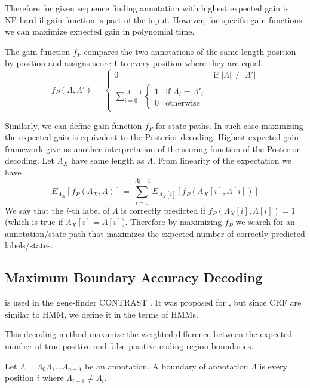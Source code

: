 Therefore for given sequence finding annotation with highest expected gain is
NP-hard if gain function is part of the input. However, for specific gain
functions we can maximize expected gain in polynomial time.

The gain function $f_P$ compares the two annotations of the same length position
by position and assigns score $1$ to every position where they are equal.
\begin{equation}
f_P(\Lambda,\Lambda') = 
\begin{cases}
0 & \text{if $|\Lambda|\not=|\Lambda'|$}\\
\sum_{i=0}^{|\Lambda|-1}\begin{cases}
1 & \text{if $\Lambda_i=\Lambda'_i$}\\
0 & \text{otherwise}
\end{cases}
\end{cases}
\end{equation}

Similarly, we can define gain function $f_P$ for state paths. In such case
maximizing the expected gain is equivalent to the Posterior decoding. Highest
expected gain framework give us another interpretation of the scoring function of
the Posterior decoding. Let $\Lambda_X$  have same length as $\Lambda$. From
linearity of the expectation we have \[E_{\Lambda_X}[f_P(\Lambda_X,\Lambda)] =
\sum_{i=0}^{|\Lambda|-1}E_{\Lambda_X[i]}[f_P(\Lambda_X[i],\Lambda[i])]\] We say
that the $i$-th label of $\Lambda$ is correctly predicted if
$f_P(\Lambda_X[i],\Lambda[i])=1$ (which is true if $\Lambda_X[i]=\Lambda[i]$). Therefore  by maximizing $f_P$ we search for
an annotation/state path that maximizes the expected number of correctly
predicted labels/states.

\subsection{Maximum Boundary Accuracy Decoding}\label{SECTION:MBAD}

 is used in the gene-finder
CONTRAST \cite{Gross2007}. It
was proposed for , but since CRF
are similar to HMM, we define it in the terms of HMMs.

This decoding method  maximize the weighted difference between the expected
number of true-positive and false-positive coding region boundaries.

\begin{definition}
Let $\Lambda=\Lambda_0\Lambda_1\dots\Lambda_{n-1}$ be an annotation. A boundary of
annotation $\Lambda$ is every position $i$ where $\Lambda_{i-1}\not=\Lambda_i$. 
\end{definition}

